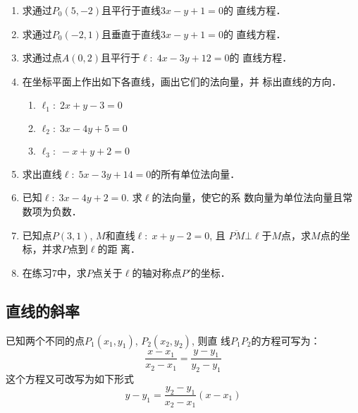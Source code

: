 \begin{ex}
\begin{enumerate}
    \item 求通过$P_0(5,-2)$且平行于直线$3x-y+1=0$的
    直线方程．
    \item 求通过$P_0(-2,1)$且垂直于直线$3x-y+1=0$的
    直线方程．
    \item 求通过点$A(0,2)$且平行于$\ell:\; 4x-3y+12=0$的
    直线方程．
    \item 在坐标平面上作出如下各直线，画出它们的法向量，并
    标出直线的方向．
\begin{enumerate}
    \item $\ell_1:\; 2x+y-3=0$
    \item $\ell_2:\; 3x-4y+5=0$
    \item $\ell_3:\; -x+y+2=0$
\end{enumerate}
    \item 求出直线$\ell:\; 5x-3y+14=0$的所有单位法向量．
    \item 已知$\ell:\; 3x-4y+2=0$. 求$\ell$的法向量，使它的系
    数向量为单位法向量且常数项为负数．
    \item 已知点$P(3,1)$, $M$和直线$\ell:\; x+y-2=0$, 且
    $\overline{PM}\bot \ell$于$M$点，求$M$点的坐标，并求$P$点到$\ell$的距
    离．
    \item 在练习7中，求$P$点关于$\ell$的轴对称点$P'$的坐标．
\end{enumerate}
\end{ex}

\subsection{直线的斜率}

已知两个不同的点$P_1(x_1,y_1)$, $P_2(x_2,y_2)$, 则直
线$P_1P_2$的方程可写为：
\[\frac{x-x_1}{x_2-x_1}=\frac{y-y_1}{y_2-y_1}\]
这个方程又可改写为如下形式
\[y-y_1=\frac{y_2-y_1}{x_2-x_1}(x-x_1)\]

\begin{figure}[htp]
    \centering
{}
    \caption{}
\end{figure}


